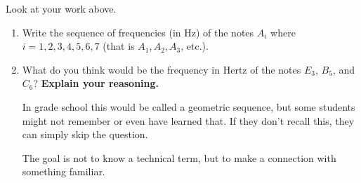 \documentclass[12pt,noauthor,nooutcomes,handout,hints]{ximera}
\begin{document}
\begin{question} Look at your work above.
\begin{enumerate}

\item Write the sequence of frequencies (in Hz) of the notes $A_i$ where $i=1,2,3,4,5,6,7$ (that is $A_1, A_2, A_3$, etc.).

\answerspace


    \item What do you think would be the frequency in Hertz of the notes $E_3$, $B_5$, and $C_6$? \textbf{Explain your reasoning.}

\answerspace




\begin{instructorNotes}
In grade school this would be called a geometric sequence, but some students might not remember or even have learned that. If they don't recall this, they can simply skip the question.

The goal is not to know a technical term, but to make a connection with something familiar.
\end{instructorNotes}




\end{enumerate}
\end{question}
\end{document}
